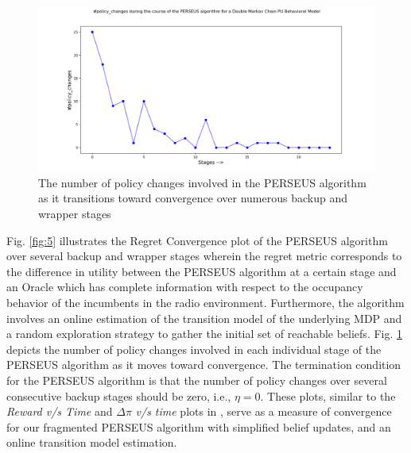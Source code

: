 \documentclass[10pt,twocolumn]{IEEEtran}
\begin{document}
\begin{figure}
    \centering
    \includegraphics[scale=0.25]{Policy_Changes_Plot_04112019.png}
    \caption{The number of policy changes involved in the PERSEUS algorithm as it transitions toward convergence over numerous backup and wrapper stages}
    \label{fig:6}
\end{figure}
Fig. \ref{fig:5} illustrates the Regret Convergence plot of the PERSEUS algorithm over several backup and wrapper stages wherein the regret metric corresponds to the difference in utility between the PERSEUS algorithm at a certain stage and an Oracle which has complete information with respect to the occupancy behavior of the incumbents in the radio environment. Furthermore, the algorithm involves an online estimation of the transition model of the underlying MDP and a random exploration strategy to gather the initial set of reachable beliefs. Fig. \ref{fig:6} depicts the number of policy changes involved in each individual stage of the PERSEUS algorithm as it moves toward convergence. The termination condition for the PERSEUS algorithm is that the number of policy changes over several consecutive backup stages should be zero, i.e., $\eta = 0$. These plots, similar to the \textit{Reward v/s Time} and $\Delta \pi$ \textit{v/s time} plots in \cite{DBLP:journals/corr/abs-1109-2145}, serve as a measure of convergence for our fragmented PERSEUS algorithm with simplified belief updates, and an online transition model estimation.
\end{document}
